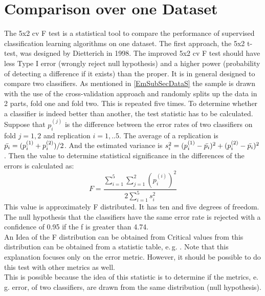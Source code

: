 \section{Comparison over one Dataset}\label{EmSecOneData}
The 5x2 cv F test is a statistical tool to compare the performance of supervised classification learning algorithms on one dataset. \cite{Chen.2009}
The first approach, the 5x2 t-test, was designed by Dietterich in 1998. \cite{Dietterich.1998}
The improved 5x2 cv F test should have less Type I error (wrongly reject null hypothesis) and a higher power (probability of detecting a difference if it exists) than the proper.\cite{Alpaydm.1999}
It is in general designed to compare two classifiers.
As mentioned in \ref{EmSubSecDataS} the sample is drawn with the use of the cross-validation approach and randomly splits up the data in 2 parts, fold one and fold two.
This is repeated five times. 
To determine whether a classifier is indeed better than another, the test statistic has to be calculated.\\
Suppose that $p_i^{(j)}$ is the difference between the error rates of two classifiers on fold $j = 1,2$ and replication $i=1,..5$.
The average of a replication is $\bar{p_i} = (p_i^{(1)}+p_i^{(2)})/2$.
And the estimated variance is $s_i^2=(p_i^{(1)}-\bar{p_i})^2+(p_i^{(2)}-\bar{p_i})^2$.
Then the value to determine statistical significance in the differences of the errors is calculated as:
\begin{equation}
	F = \frac{\sum_{i=1}^{5}\sum_{j=1}^{2}(p_i^{(i)})^2}{2\sum_{i=1}^{5}s_i^2}
\end{equation}
This value is approximately F distributed. It has ten and five degrees of freedom.
The null hypothesis that the classifiers have the same error rate is rejected with a confidence of 0.95 if the f is greater than 4.74. \\
An Idea of the F distribution can be obtained from \cite[p. 338-340]{Teschl.2014}
Critical values from this distribution can be obtained from a statistic table, e.\,g. \cite[p. 591]{Bortz.2010}.
Note that this explanation focuses only on the error metric.
However, it should be possible to do this test with other metrics as well.\\
This is possible because the idea of this statistic is to determine if the metrics, e.\,g. error, of two classifiers, are drawn from the same distribution (null hypothesis).\cite{Alpaydm.1999}

